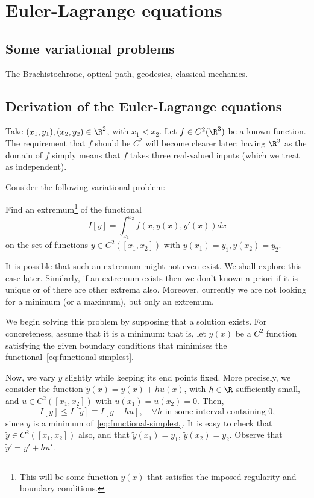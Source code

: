 \section{Euler-Lagrange equations}

\newcommand{\yt}{\tilde{y}}

\subsection{Some variational problems}
The Brachistochrone, optical path, geodesics, classical mechanics.

\subsection{Derivation of the Euler-Lagrange equations}
Take $(x_1, y_1), (x_2, y_2) \in \R^2$, with $x_1 < x_2$. Let $f \in C^{2}(\R^3)$ be a known function. The requirement that $f$ should be $C^2$ will become clearer later; having $\R^3$ as the domain of $f$ simply means that $f$ takes three real-valued inputs (which we treat as independent).

Consider the following variational problem:

\begin{problem}
Find an extremum\footnote{This will be some function $y(x)$ that satisfies the imposed regularity and boundary conditions.} of the functional
\begin{equation}
    I[y] = \int_{x_1}^{x_2} f(x, y(x), y'(x)) dx
    \label{eq:functional-simplest}
\end{equation}
on the set of functions $y \in C^{2}([x_1, x_2])$ with $y(x_1)=y_1, y(x_2)=y_2$.
\end{problem}

It is possible that such an extremum might not even exist. We shall explore this case later. Similarly, if an extremum exists then we don't known a priori if it is unique or of there are other extrema also. Moreover, currently we are not looking for a minimum (or a maximum), but only an extremum.

We begin solving this problem by supposing that a solution exists. For concreteness, assume that it is a minimum: that is, let $y(x)$ be a $C^2$ function satisfying the given boundary conditions that minimises the functional~\eqref{eq:functional-simplest}.

Now, we vary $y$ slightly while keeping its end points fixed. More precisely, we consider the function $\tilde{y}(x) = y(x) + hu(x)$, with $h \in \R$ sufficiently small, and $u \in C^{2}([x_1, x_2])$ with $u(x_1)=u(x_2)=0$. Then,
\begin{equation}
    I[y] \leq I[\yt] \equiv I[y+hu], \quad\forall h\text{ in some interval containing $0$,}
\end{equation}
since $y$ is a minimum of~\eqref{eq:functional-simplest}. It is easy to check that $\yt \in C^{2}([x_1, x_2])$ also, and that $\yt(x_1)=y_1$, $\yt(x_2)=y_2$. Observe that $\yt' = y' + hu'$.

